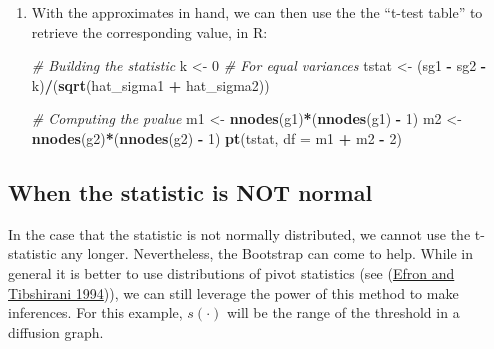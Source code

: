 \documentclass[
]{book}
\newenvironment{Shaded}{\begin{snugshade}}{\end{snugshade}}
\newcommand{\AttributeTok}[1]{\textcolor[rgb]{0.13,0.29,0.53}{#1}}
\newcommand{\CommentTok}[1]{\textcolor[rgb]{0.56,0.35,0.01}{\textit{#1}}}
\newcommand{\DecValTok}[1]{\textcolor[rgb]{0.00,0.00,0.81}{#1}}
\newcommand{\FunctionTok}[1]{\textcolor[rgb]{0.13,0.29,0.53}{\textbf{#1}}}
\newcommand{\NormalTok}[1]{#1}
\newcommand{\OtherTok}[1]{\textcolor[rgb]{0.56,0.35,0.01}{#1}}
\newcommand{\SpecialCharTok}[1]{\textcolor[rgb]{0.81,0.36,0.00}{\textbf{#1}}}
\begin{document}
\begin{enumerate}
\begin{Shaded}
\end{Shaded}
\item
  With the approximates in hand, we can then use the the ``t-test table'' to
  retrieve the corresponding value, in R:

\begin{Shaded}
\begin{Highlighting}[]
\CommentTok{\# Building the statistic}
\NormalTok{k }\OtherTok{\textless{}{-}} \DecValTok{0} \CommentTok{\# For equal variances}
\NormalTok{tstat }\OtherTok{\textless{}{-}}\NormalTok{ (sg1 }\SpecialCharTok{{-}}\NormalTok{ sg2 }\SpecialCharTok{{-}}\NormalTok{ k)}\SpecialCharTok{/}\NormalTok{(}\FunctionTok{sqrt}\NormalTok{(hat\_sigma1 }\SpecialCharTok{+}\NormalTok{ hat\_sigma2))}

\CommentTok{\# Computing the pvalue}
\NormalTok{m1 }\OtherTok{\textless{}{-}} \FunctionTok{nnodes}\NormalTok{(g1)}\SpecialCharTok{*}\NormalTok{(}\FunctionTok{nnodes}\NormalTok{(g1) }\SpecialCharTok{{-}} \DecValTok{1}\NormalTok{)}
\NormalTok{m2 }\OtherTok{\textless{}{-}} \FunctionTok{nnodes}\NormalTok{(g2)}\SpecialCharTok{*}\NormalTok{(}\FunctionTok{nnodes}\NormalTok{(g2) }\SpecialCharTok{{-}} \DecValTok{1}\NormalTok{)}
\FunctionTok{pt}\NormalTok{(tstat, }\AttributeTok{df =}\NormalTok{ m1 }\SpecialCharTok{+}\NormalTok{ m2 }\SpecialCharTok{{-}} \DecValTok{2}\NormalTok{)}
\end{Highlighting}
\end{Shaded}
\end{enumerate}

\hypertarget{when-the-statistic-is-not-normal}{%
\subsection{When the statistic is NOT normal}\label{when-the-statistic-is-not-normal}}

In the case that the statistic is not normally distributed, we cannot use the
t-statistic any longer. Nevertheless, the Bootstrap can come to help. While
in general it is better to use distributions of pivot statistics (see (\protect\hyperlink{ref-Efron1994}{Efron and Tibshirani 1994})),
we can still leverage the power of this method to make inferences. For this
example, \(s(\cdot)\) will be the range of the threshold in a diffusion graph.
\end{document}
